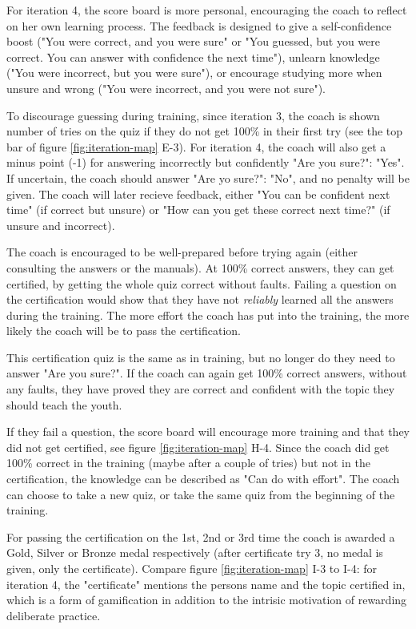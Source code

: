   For iteration 4, the score board is more personal, encouraging the coach to reflect on her own learning process. The feedback is designed to give a self-confidence boost ("You were correct, and you were sure" or "You guessed, but you were correct. You can answer with confidence the next time"), unlearn knowledge ("You were incorrect, but you were sure"), or encourage studying more when unsure and wrong ("You were incorrect, and you were not sure").

  To discourage guessing during training, since iteration 3, the coach is shown number of tries on the quiz if they do not get 100\% in their first try (see the top bar of figure \ref{fig:iteration-map} E-3). For iteration 4, the coach will also get a minus point (-1) for answering incorrectly but confidently "Are you sure?": "Yes". If uncertain, the coach should answer "Are yo sure?": "No", and no penalty will be given. The coach will later recieve feedback, either "You can be confident next time" (if correct but unsure) or "How can you get these correct next time?" (if unsure and incorrect).

  The coach is encouraged to be well-prepared before trying again (either consulting the answers or the manuals). At 100\% correct answers, they can get certified, by getting the whole quiz correct without faults. Failing a question on the certification would show that they have not \textit{reliably} learned all the answers during the training. The more effort the coach has put into the training, the more likely the coach will be to pass the certification.


   This certification quiz is the same as in training, but no longer do they need to answer "Are you sure?". If the coach can again get 100\% correct answers, without any faults, they have proved they are correct and confident with the topic they should teach the youth.

   If they fail a question, the score board will encourage more training and that they did not get certified, see figure \ref{fig:iteration-map} H-4. Since the coach did get 100\% correct in the training (maybe after a couple of tries) but not in the certification, the knowledge can be described as "Can do with effort". The coach can choose to take a new quiz, or take the same quiz from the beginning of the training.

   For passing the certification on the 1st, 2nd or 3rd time the coach is awarded a Gold, Silver or Bronze medal respectively (after certificate try 3, no medal is given, only the certificate). Compare figure \ref{fig:iteration-map} I-3 to I-4: for iteration 4, the "certificate" mentions the persons name and the topic certified in, which is a form of gamification in addition to the intrisic motivation of rewarding deliberate practice.

